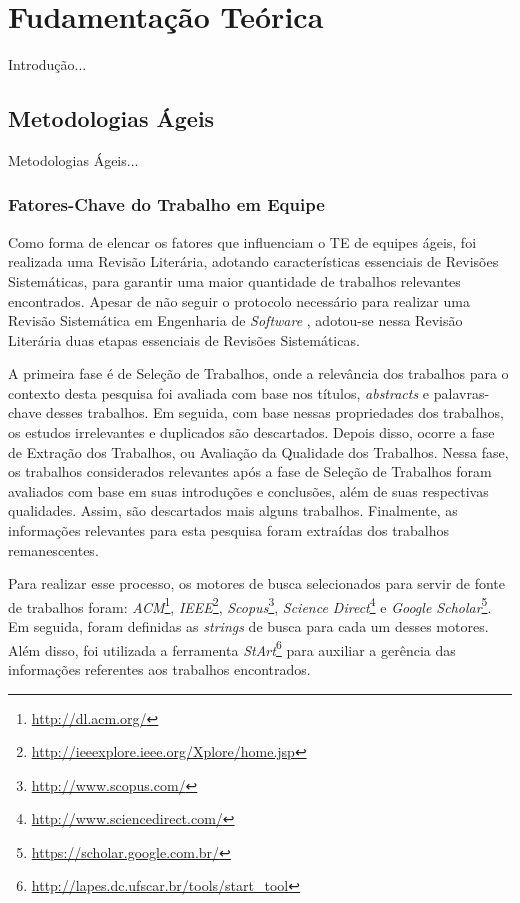 \chapter{Fudamentação Teórica}
\label{fundamentacao}

{\color{red} Introdução...}

\section{Metodologias Ágeis}
\label{fundamentacao:ageis}

{\color{red} Metodologias Ágeis...}

\subsection{Fatores-Chave do Trabalho em Equipe}
\label{fundamentacao:ageis:fatores}

Como forma de elencar os fatores que influenciam o TE de equipes ágeis, foi realizada uma Revisão Literária, adotando características essenciais de Revisões Sistemáticas, para garantir uma maior quantidade de trabalhos relevantes encontrados. Apesar de não seguir o protocolo necessário para realizar uma Revisão Sistemática em Engenharia de \textit{Software} \cite{kitchenhan}, adotou-se nessa Revisão Literária duas etapas essenciais de Revisões Sistemáticas.

A primeira fase é de Seleção de Trabalhos, onde a relevância dos trabalhos para o contexto desta pesquisa foi avaliada com base nos títulos, \textit{abstracts} e palavras-chave desses trabalhos. Em seguida, com base nessas propriedades dos trabalhos, os estudos irrelevantes e duplicados são descartados. Depois disso, ocorre a fase de Extração dos Trabalhos, ou Avaliação da Qualidade dos Trabalhos. Nessa fase, os trabalhos considerados relevantes após a fase de Seleção de Trabalhos foram avaliados com base em suas introduções e conclusões, além de suas respectivas qualidades. Assim, são descartados mais alguns trabalhos. Finalmente, as informações relevantes para esta pesquisa foram extraídas dos trabalhos remanescentes.

Para realizar esse processo, os motores de busca selecionados para servir de fonte de trabalhos foram: \textit{ACM}\footnote{\url{http://dl.acm.org/}}, \textit{IEEE}\footnote{\url{http://ieeexplore.ieee.org/Xplore/home.jsp}}, \textit{Scopus}\footnote{\url{http://www.scopus.com/}}, \textit{Science Direct}\footnote{\url{http://www.sciencedirect.com/}} e \textit{Google Scholar}\footnote{\url{https://scholar.google.com.br/}}. Em seguida, foram definidas as \textit{strings} de busca para cada um desses motores. Além disso, foi utilizada a ferramenta \textit{StArt}\footnote{\url{http://lapes.dc.ufscar.br/tools/start_tool}} para auxiliar a gerência das informações referentes aos trabalhos encontrados.

